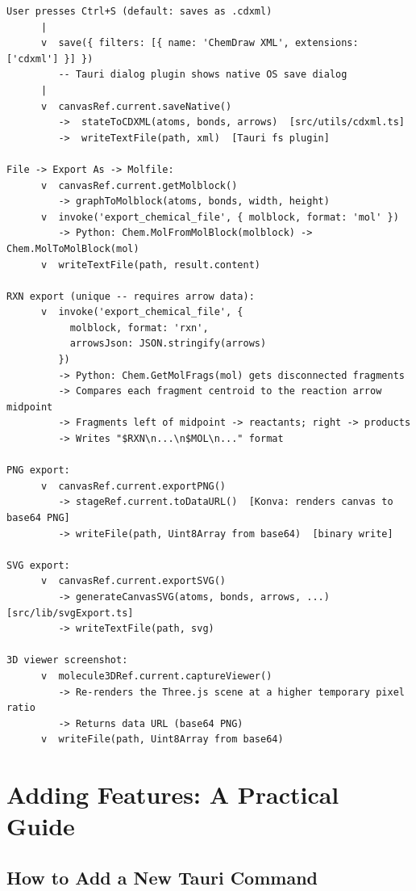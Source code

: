 \documentclass[11pt,a4paper]{article}
\begin{document}
\begin{lstlisting}[language={}]
User presses Ctrl+S (default: saves as .cdxml)
      |
      v  save({ filters: [{ name: 'ChemDraw XML', extensions: ['cdxml'] }] })
         -- Tauri dialog plugin shows native OS save dialog
      |
      v  canvasRef.current.saveNative()
         ->  stateToCDXML(atoms, bonds, arrows)  [src/utils/cdxml.ts]
         ->  writeTextFile(path, xml)  [Tauri fs plugin]

File -> Export As -> Molfile:
      v  canvasRef.current.getMolblock()
         -> graphToMolblock(atoms, bonds, width, height)
      v  invoke('export_chemical_file', { molblock, format: 'mol' })
         -> Python: Chem.MolFromMolBlock(molblock) -> Chem.MolToMolBlock(mol)
      v  writeTextFile(path, result.content)

RXN export (unique -- requires arrow data):
      v  invoke('export_chemical_file', {
           molblock, format: 'rxn',
           arrowsJson: JSON.stringify(arrows)
         })
         -> Python: Chem.GetMolFrags(mol) gets disconnected fragments
         -> Compares each fragment centroid to the reaction arrow midpoint
         -> Fragments left of midpoint -> reactants; right -> products
         -> Writes "$RXN\n...\n$MOL\n..." format

PNG export:
      v  canvasRef.current.exportPNG()
         -> stageRef.current.toDataURL()  [Konva: renders canvas to base64 PNG]
         -> writeFile(path, Uint8Array from base64)  [binary write]

SVG export:
      v  canvasRef.current.exportSVG()
         -> generateCanvasSVG(atoms, bonds, arrows, ...)  [src/lib/svgExport.ts]
         -> writeTextFile(path, svg)

3D viewer screenshot:
      v  molecule3DRef.current.captureViewer()
         -> Re-renders the Three.js scene at a higher temporary pixel ratio
         -> Returns data URL (base64 PNG)
      v  writeFile(path, Uint8Array from base64)
\end{lstlisting}

\section{Adding Features: A Practical Guide}
\label{sec:adding}

\subsection{How to Add a New Tauri Command}
\end{document}
